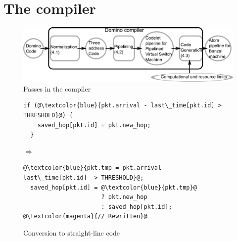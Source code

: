 \section{The \pktlanguage compiler}
\label{s:compiler}
\begin{figure}[!t]
  \includegraphics[width=\columnwidth]{compiler.pdf}
  \caption{Passes in the \pktlanguage compiler}
  \label{fig:passes}
\end{figure}

\begin{figure}[!t]
  \hspace{-0.3in}
  \begin{minipage}{0.55\textwidth}
  \begin{small}
  \begin{lstlisting}[style=customc, numbers=none, frame=none]
  if (@\textcolor{blue}{pkt.arrival - last\_time[pkt.id] > THRESHOLD}@) {
    saved_hop[pkt.id] = pkt.new_hop;
  }
  \end{lstlisting}
  \end{small}
  \end{minipage}
%  
  \hspace{-0.5in}
  $\Longrightarrow$ 
  \hspace{-0.3in}
%  
  \begin{minipage}{0.6\textwidth}
  \begin{small}
  \begin{lstlisting}[style=customc, numbers=none, frame=none]
  @\textcolor{blue}{pkt.tmp = pkt.arrival - last\_time[pkt.id]  > THRESHOLD}@;
  saved_hop[pkt.id] = @\textcolor{blue}{pkt.tmp}@
                      ? pkt.new_hop
                      : saved_hop[pkt.id]; @\textcolor{magenta}{// Rewritten}@
  \end{lstlisting}
  \end{small}
  \end{minipage}
\caption{Conversion to straight-line code}
\label{fig:if_convert}
\end{figure}

